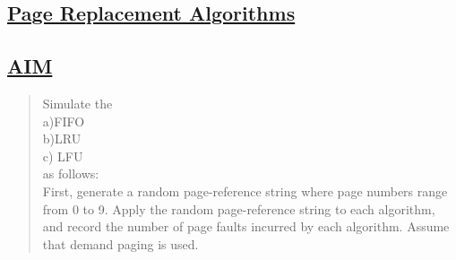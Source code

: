 \documentclass[a4paper, 12pt]{article}
\begin{document}
\newpage
\begin{center}
\section*{\LARGE \textbf{\underline{Page Replacement Algorithms}}} 
\end{center}

\subsection*{\underline{AIM}}
\begin{quote}
Simulate the\\
a)FIFO\\
b)LRU\\
c) LFU\\
as follows: \\
First, generate a random page-reference string where page numbers range from 0 to 9. Apply the random page-reference string to each algorithm, and record the number of page faults incurred by each algorithm. Assume that demand paging is used.\\
\end{quote}
\end{document}
